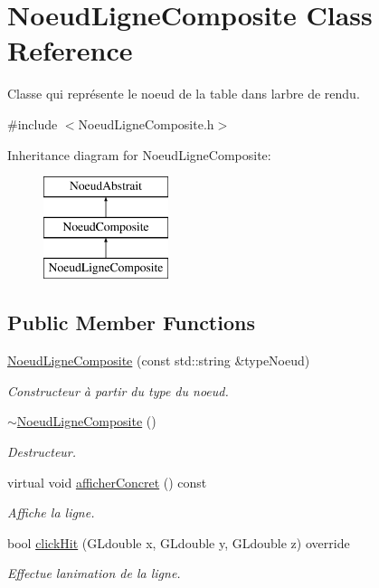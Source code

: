\hypertarget{class_noeud_ligne_composite}{}\section{Noeud\+Ligne\+Composite Class Reference}
\label{class_noeud_ligne_composite}


Classe qui représente le noeud de la table dans l\textquotesingle{}arbre de rendu.  




{\ttfamily \#include $<$Noeud\+Ligne\+Composite.\+h$>$}

Inheritance diagram for Noeud\+Ligne\+Composite\+:\begin{figure}[H]
\begin{center}
\leavevmode
\includegraphics[height=3.000000cm]{class_noeud_ligne_composite}
\end{center}
\end{figure}
\subsection*{Public Member Functions}
{\bf }\par
\begin{DoxyCompactItemize}
\item 
\hyperlink{class_noeud_ligne_composite_af9846268635cbb0331feab18575c2607}{Noeud\+Ligne\+Composite} (const std\+::string \&type\+Noeud)
\begin{DoxyCompactList}\small\item\em Constructeur à partir du type du noeud. \end{DoxyCompactList}\item 
\hyperlink{class_noeud_ligne_composite_a400904537333bb2ae7e462ced349bdd2}{$\sim$\+Noeud\+Ligne\+Composite} ()
\begin{DoxyCompactList}\small\item\em Destructeur. \end{DoxyCompactList}\item 
virtual void \hyperlink{class_noeud_ligne_composite_a24738e9ba75c1b0d69e5a99edcba1682}{afficher\+Concret} () const 
\begin{DoxyCompactList}\small\item\em Affiche la ligne. \end{DoxyCompactList}\item 
bool \hyperlink{class_noeud_ligne_composite_a2b7f3bf28018fc6c6616b539dc342524}{click\+Hit} (G\+Ldouble x, G\+Ldouble y, G\+Ldouble z) override
\begin{DoxyCompactList}\small\item\em Effectue l\textquotesingle{}animation de la ligne. \end{DoxyCompactList}\end{DoxyCompactItemize}

